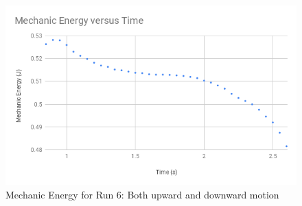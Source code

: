 %
\begin{figure}[ht]
    \centering
    \includegraphics[scale=0.71]{image/07-mechanic/energy-6.png}
    \caption{Mechanic Energy for Run 6: Both upward and downward motion}
    \label{figure.07.run.6.e}
\end{figure}
%